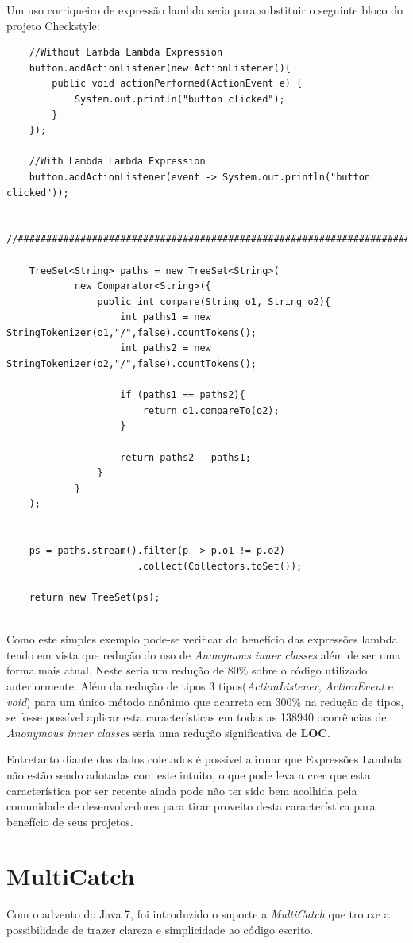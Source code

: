 Um uso corriqueiro de expressão lambda seria para substituir o seguinte bloco do projeto Checkstyle:
\begin{lstlisting}
	//Without Lambda Lambda Expression
	button.addActionListener(new ActionListener(){
		public void actionPerformed(ActionEvent e) {
			System.out.println("button clicked");
		}
	});

	//With Lambda Lambda Expression
	button.addActionListener(event -> System.out.println("button clicked"));
	
	//###########################################################################
	
	TreeSet<String> paths = new TreeSet<String>(
			new Comparator<String>({
				public int compare(String o1, String o2){
					int paths1 = new StringTokenizer(o1,"/",false).countTokens();
					int paths2 = new StringTokenizer(o2,"/",false).countTokens();
				
					if (paths1 == paths2){
						return o1.compareTo(o2);
					}
				
					return paths2 - paths1;
				}
			}
	);
	
	
	ps = paths.stream().filter(p -> p.o1 != p.o2)
					   .collect(Collectors.toSet());
	
	return new TreeSet(ps);
	
\end{lstlisting}

Como este simples exemplo pode-se verificar do benefício das expressões lambda tendo em vista que  redução do uso de \textit{Anonymous inner classes} além de ser uma forma mais atual. Neste seria um redução de 80\% sobre o código utilizado anteriormente. Além da redução de tipos 3 tipos(\textit{ActionListener}, \textit{ActionEvent} e \textit{void}) para um único método anônimo que acarreta em 300\% na redução de tipos,  se fosse possível aplicar esta características em todas as 138940 ocorrências de \textit{Anonymous inner classes} seria uma redução significativa de \textbf{LOC}.

Entretanto diante dos dados coletados é possível afirmar que Expressões Lambda não estão sendo adotadas com este intuito, o que pode leva a crer que esta característica por ser recente ainda pode não ter sido bem acolhida pela comunidade de desenvolvedores para tirar proveito desta  característica para benefício de seus projetos.\\

\section{MultiCatch}
Com o advento do Java 7, foi introduzido o suporte a \textit{MultiCatch} que trouxe a possibilidade de trazer clareza e simplicidade ao código escrito.\\

